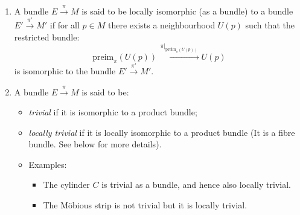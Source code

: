 \documentclass{article}
\begin{document}
\begin{enumerate}
\item {} 
A bundle $E\xrightarrow{\,\pi\,}M$ is said to be {locally isomorphic (as a bundle)} to a bundle $E'\xrightarrow{\,\pi'\,}M'$ if for all $p\in M$ there exists a neighbourhood $U(p)$ such that the restricted bundle:
\begin{equation*}
\mathrm{preim}_\pi(U(p))\xrightarrow{\,\pi|_{\mathrm{preim}_\pi(U(p))}\,}U(p)
\end{equation*}
is isomorphic to the bundle $E'\xrightarrow{\,\pi'\,}M'$.
\item {} A bundle $E\xrightarrow{\,\pi\,}M$ is said to be:
\begin{itemize}
    \item \emph{trivial} if it is isomorphic to a product bundle;
    \item \emph{locally trivial} if it is locally isomorphic to a product bundle (It is a fibre bundle. See below for more details).
    \item Examples: 
    \begin{itemize}[$\dagger$]
        \item The cylinder $C$ is trivial as a bundle, and hence also locally trivial. 
        \item The M\"obious strip is not trivial but it is locally trivial.
    \end{itemize}
\end{itemize}


\end{enumerate}
\end{document}
